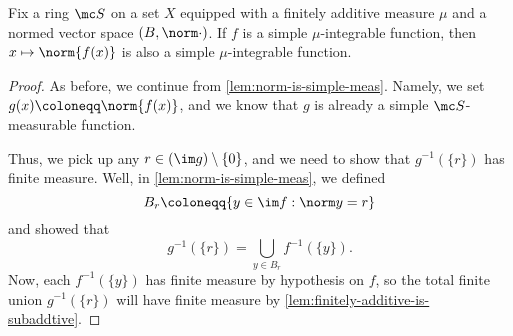 \documentclass[../notes.tex]{subfiles}
\begin{document}
\begin{lemma}
	Fix a ring $\mc S$ on a set $X$ equipped with a finitely additive measure $\mu$ and a normed vector space $(B,\norm\cdot)$. If $f$ is a simple $\mu$-integrable function, then $x\mapsto\norm{f(x)}$ is also a simple $\mu$-integrable function.
\end{lemma}
\begin{proof}
	As before, we continue from \autoref{lem:norm-is-simple-meas}. Namely, we set $g(x)\coloneqq\norm{f(x)}$, and we know that $g$ is already a simple $\mc S$-measurable function.

	Thus, we pick up any $r\in(\im g)\setminus\{0\}$, and we need to show that $g^{-1}(\{r\})$ has finite measure. Well, in \autoref{lem:norm-is-simple-meas}, we defined
	\[B_r\coloneqq\{y\in\im f:\norm y=r\}\]
	and showed that
	\[g^{-1}(\{r\})=\bigcup_{y\in B_r}f^{-1}(\{y\}).\]
	Now, each $f^{-1}(\{y\})$ has finite measure by hypothesis on $f$, so the total finite union $g^{-1}(\{r\})$ will have finite measure by \autoref{lem:finitely-additive-is-subaddtive}.
\end{proof}
\end{document}
